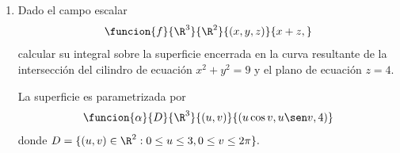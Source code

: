 \documentclass[a4,11pt]{aleph-examen}
\begin{document}
\begin{preguntas}
\begin{respuesta}
\begin{respuesta}
\begin{respuesta}
\begin{enumerate}
\begin{respuesta}
    Por tanto
    \begin{align*}
        \iint_{S_i}[x(u,v)]^2du\,dv=\int_{-2}^2\int_{-2}^2u^2du\,dv \quad&; \quad para\quad  i=1,2,3,4 \\
        \iint_{S_i}[x(u,v)]^2du\,dv=\int_{-2}^2\int_{-2}^24du\,dv \quad&; \quad para\quad  i=5,6 \\ 
    \end{align*}
    entonces
    \begin{align*}
        \iint_Sx^2\,ds&=\sum_{i=1}^6\iint_{S_i}[x(u,v)]^2\|N(u,v)\|du\,dv\\
        &=4\int_{-2}^2\int_{-2}^2u^2du\,dv+2\int_{-2}^2\int_{-2}^24du\,dv\\
        &=4\int_{-2}^2\frac{u^3}{3}|_{-2}^2\,dv+8\int_{-2}^2u|_{-2}^2\,dv\\
        &=\frac{256}{3}+128\\
        &=\frac{640}{3}
    \end{align*}
\end{respuesta}

\item 
    Dado el campo escalar
	\[
    	\funcion{f}{\R^3}{\R^2}{(x,y,z)}{x+z,} 
    \]
    calcular su integral sobre la superficie encerrada en la curva resultante de la intersección del cilindro de ecuación $x^2+y^2=9$ y el plano de ecuación $z=4$.

\begin{respuesta}
    La superficie es parametrizada por
    \[
        \funcion{\alpha}{D}{\R^3}{(u,v)}{(u \cos v,u \sen v,4)}
    \]
    donde $D=\{(u,v)\in\R^2:0\leq u \leq 3,0\leq v \leq 2\pi \}.$
    

\end{respuesta}
\end{enumerate}
\end{respuesta}
\end{respuesta}
\end{respuesta}
\end{preguntas}
\end{document}
